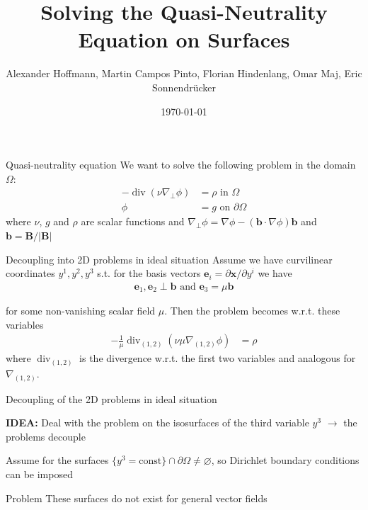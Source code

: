 \documentclass[
	english,%
	logo=false,%
	eurofusion=false, %
	titlegraphic=true, %
	]{ippbeamer}
\title{Solving the Quasi-Neutrality Equation on Surfaces}
\author{Alexander Hoffmann, Martin Campos Pinto, Florian Hindenlang, Omar Maj, 
		Eric Sonnendrücker}
\date{\today}
\DeclareMathOperator{\diver}{div}
\begin{document}
\frame{\titlepage}
\begin{frame}{Quasi-neutrality equation}
	We want to solve the following problem in the domain $\Omega$:
	\begin{align*}
		-\diver (\nu \nabla_{\perp} \phi) &= \rho \text{ in $\Omega$} \\
		\phi &= g \text{ on $\partial \Omega$}
	\end{align*}
	where $\nu$, $g$
	and $\rho$ are scalar functions and 
	$\nabla_\perp \phi = \nabla \phi - (\mathbf{b} \cdot \nabla \phi) \mathbf{b}$ 
	and $\mathbf{b} = \mathbf{B}/|\mathbf{B}| $

\end{frame}

\begin{frame}{Decoupling into 2D problems in ideal situation}
	Assume we have curvilinear coordinates $y^1, y^2, y^3$ s.t. 
		for the basis vectors $\mathbf{e}_i = \partial \mathbf{x}/ \partial y^i$ we have
		\begin{align*}
			\mathbf{e}_1, \mathbf{e}_2 \perp \mathbf{b} \text{ and } \mathbf{e}_3 = \mu \mathbf{b}
		\end{align*}		
	
	for some non-vanishing scalar field $\mu$.
	Then the problem becomes w.r.t. these variables
	\begin{align*}
		-\frac{1}{\mu}\diver_{(1,2)} (\nu \mu \nabla_{(1,2)} \phi) &= \rho
	\end{align*}
	where $\diver_{(1,2)}$ is the divergence 
	w.r.t. the first two variables
	and analogous for $\nabla_{(1,2)}$. 
\end{frame}
\begin{frame}{Decoupling of the 2D problems in ideal situation}
	\begin{exampleblock}{}
		\textbf{IDEA:} Deal with the problem on the isosurfaces
		of the third variable $y^3$ $\rightarrow$ the problems decouple	
	\end{exampleblock}
	

	Assume for the 
	surfaces $\{ y^3 = \text{const} \} \cap \partial \Omega \neq \varnothing$,
	so Dirichlet boundary conditions can be imposed

	\begin{alertblock}{Problem}
		These surfaces do not exist for general vector fields
	\end{alertblock}
	\end{frame}
\end{document}
